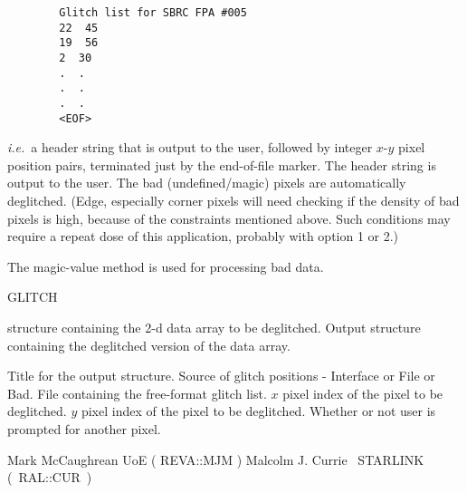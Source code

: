 {\begin{manroutinedescription}
\begin{manenumerate}
\begin{verbatim}
        Glitch list for SBRC FPA #005
        22  45
        19  56
        2  30
        .  .
        .  .
        .  .
        <EOF>
\end{verbatim}

  {\it i.e.}\ a header string that is output to the user, followed by
  integer {$x$}-{$y$} pixel position pairs, terminated just by the
  end-of-file marker. The header string is output to the user.
  The bad (undefined/magic) pixels are automatically deglitched.
  (Edge, especially corner pixels will need checking if the
  density of bad pixels is high, because of the constraints
  mentioned above. Such conditions may require a repeat dose of
  this application, probably with option 1 or 2.)

\end{manenumerate}
  The magic-value method is used for processing bad data.

  GLITCH

\begin{manparametertable}
  {} structure containing the 2-d data array to be deglitched.
  Output {} structure containing the deglitched version of
  the data array.
\end{manparametertable}
\begin{manparametertable}
  Title for the output {} structure.
  \mbox{}
  Source of glitch positions - {\mantt Interface} or {\mantt File} or
  {\mantt Bad}.
  File containing the free-format glitch list.
  {$x$} pixel index of the pixel to be deglitched.
  {$y$} pixel index of the pixel to be deglitched.
  Whether or not user is prompted for another pixel.
\end{manparametertable}
  Mark McCaughrean UoE ( {\mantt REVA}::{\mantt MJM} )
  Malcolm J. Currie ~STARLINK \mbox{( {\mantt RAL}::{\mantt CUR} )}
\end{manroutinedescription}

}
